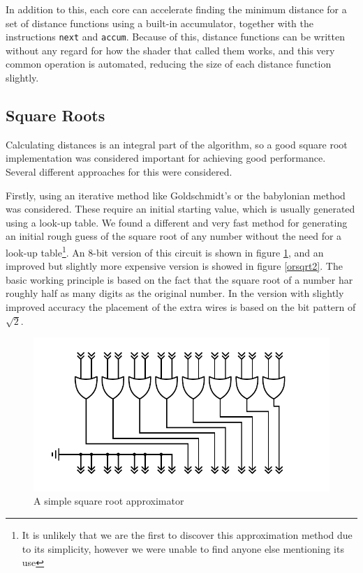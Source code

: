 			In addition to this, each core can accelerate finding the minimum 
			distance for a set of distance functions using a built-in 
			accumulator, together with the instructions \texttt{next} and 
			\texttt{accum}. Because of this, distance functions can be written
			without any regard for how the shader that called them works, and
			this very common operation is automated, reducing the size of each
			distance function slightly.

		\subsection{Square Roots}

			Calculating distances is an integral part of the algorithm, so a
			good square root implementation was considered important for
			achieving good performance. Several different approaches for this
			were considered.

			Firstly, using an iterative method like Goldschmidt's or the
			babylonian method was considered. These require an initial starting
			value, which is usually generated using a look-up table. We found a
			different and very fast method for generating an initial rough
			guess of the square root of any number without the need for a
			look-up table\footnote{It is unlikely that we are the first to
			discover this approximation method due to its simplicity, however
			we were unable to find anyone else mentioning its use}. An 8-bit
			version of this circuit is shown in figure \ref{orsqrt}, and an
			improved but slightly more expensive version is showed in figure
			\ref{orsqrt2}.  The basic working principle is based on the fact
			that the square root of a number har roughly half as many digits as
			the original number. In the version with slightly improved accuracy
			the placement of the extra wires is based on the bit pattern of
			$\sqrt{2}$.

			\begin{figure}
				\centering
				\caption{A simple square root approximator}
				\label{orsqrt}
				\includegraphics[width=0.75\linewidth]{figure/pdf/simpleOr.pdf} 
			\end{figure}


